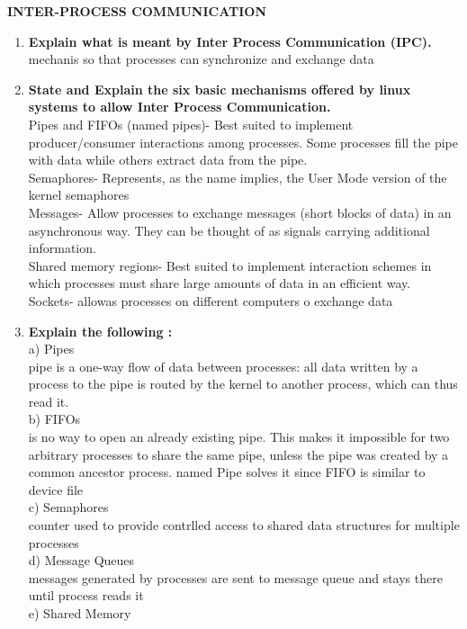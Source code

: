 \documentclass[a4paper,12pt]{article}
\begin{document}
\begin{flushleft}
\textbf{INTER-PROCESS COMMUNICATION}
\begin{enumerate}
\item \textbf{ Explain what is meant by Inter Process Communication (IPC).}\\
{\color{red}mechanis so that processes can synchronize and exchange data}\\
\item \textbf{ State and Explain the six basic mechanisms offered by linux systems to allow Inter Process Communication.}\\
{\color{red}Pipes and FIFOs (named pipes)-
Best suited to implement producer/consumer interactions among processes. Some
processes fill the pipe with data while others extract data from the pipe.\\
Semaphores-
Represents, as the name implies, the User Mode version of the kernel semaphores\\
Messages-
Allow processes to exchange messages (short blocks of data) in an asynchronous way.
They can be thought of as signals carrying additional information.\\
Shared memory regions-
Best suited to implement interaction schemes in which processes must share large
amounts of data in an efficient way.\\
Sockets- allowas processes on different computers o exchange data}\\
\item \textbf{ Explain the following :}\\
a) Pipes\\
{\color{red}pipe is a one-way flow of data between processes: all data written by a process to the pipe is
routed by the kernel to another process, which can thus read it.}\\
b) FIFOs\\
{\color{red}is no way to open an already existing pipe. This makes it
impossible for two arbitrary processes to share the same pipe, unless the pipe was created by a
common ancestor process. named Pipe solves it since FIFO is similar to device file}\\
c) Semaphores\\
{\color{red} counter used to provide contrlled access to shared data structures for multiple processes}\\
d) Message Queues\\
{\color{red}messages generated by processes are sent to message queue and stays there until process reads it}\\
e) Shared Memory\\

\end{enumerate}
\end{flushleft}
\end{document}
